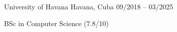 \documentclass[]{awesome-cv}
\begin{document}
\vspace{8mm}
\begin{cventries}
	\vspace{-3mm}
	\cventry
	{}
	{University of Havana \vspace{-5mm}}
	{Havana, Cuba \vspace{-5mm}}
	{09/2018 – 03/2025 \vspace{-5mm}}
	{\begin{cvsectionnormaltext}
			\item{BSc in Computer Science (7.8/10)}
		\end{cvsectionnormaltext}}
\end{cventries}
\end{document}
